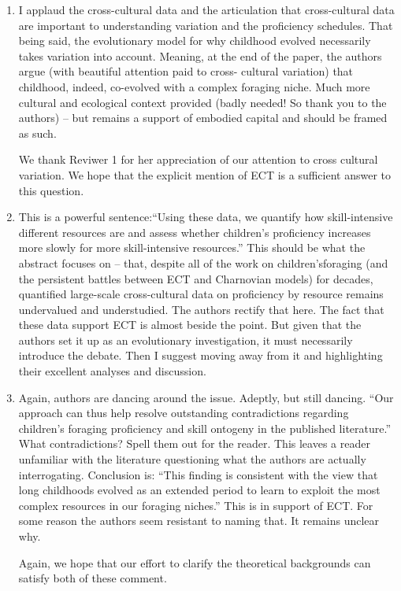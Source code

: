 \documentclass{article}
\newcommand{\rev}[1]{{\color{ForestGreen}#1}}
\begin{document}
\begin{enumerate}
    \item I applaud the cross-cultural data and the articulation that cross-cultural data are important to understanding variation and the proficiency schedules. That being said, the evolutionary model for why childhood evolved necessarily takes variation into account. Meaning, at the end of the paper, the authors argue (with beautiful attention paid to cross- cultural variation) that childhood, indeed, co-evolved with a complex foraging niche. Much more cultural and ecological context provided (badly needed! So thank you to the authors) – but remains a support of embodied capital and should be framed as such.

\rev{We thank Reviwer 1 for her appreciation of our attention to cross cultural variation. We hope that the explicit mention of ECT is a sufficient answer to this question.}

    \item This is a powerful sentence:“Using these data, we quantify how skill-intensive different resources are and assess whether children’s proficiency increases more slowly for more skill-intensive resources.” This should be what the abstract focuses on – that, despite all of the work on children’sforaging (and the persistent battles between ECT and Charnovian models) for decades, quantified large-scale cross-cultural data on proficiency by resource remains undervalued and understudied. The authors rectify that here. The fact that these data support ECT is almost beside the point. But given that the authors set it up as an evolutionary investigation, it must necessarily introduce the debate. Then I suggest moving away from it and highlighting their excellent analyses and discussion.

    \item Again, authors are dancing around the issue. Adeptly, but still dancing. “Our approach can thus help resolve outstanding contradictions regarding children’s foraging proficiency and skill ontogeny in the published literature.” What contradictions? Spell them out for the reader. This leaves a reader unfamiliar with the literature questioning what the authors are actually interrogating. Conclusion is: “This finding is consistent with the view that long childhoods evolved as an extended period to learn to exploit the most complex resources in our foraging niches.” This is in support of ECT. For some reason the authors seem resistant to naming that. It remains unclear why.


\rev{Again, we hope that our effort to clarify the theoretical backgrounds can satisfy both of these comment.}


\end{enumerate}
\end{document}
